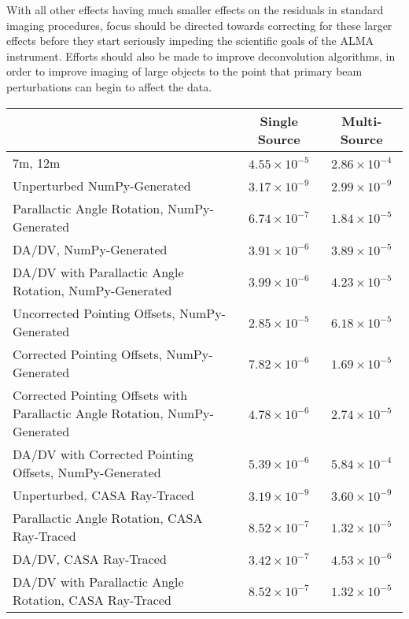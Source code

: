 \documentclass[11pt]{article}
\begin{document}
With all other effects having much smaller effects on the
residuals in standard imaging procedures, focus should be directed towards
correcting for these larger effects before they start seriously impeding the
scientific goals of the ALMA instrument. Efforts should also be made to improve 
deconvolution algorithms, in order to improve imaging of large objects to the 
point that primary beam perturbations can begin to affect the data.

\begin{table}
    \centering
    \begin{tabular}{|p{8cm}|c|c|}
    \hline
    & Single Source & Multi-Source  \\
    \hline
    7m, 12m & $4.55 \times 10^{-5}$ & $2.86 \times 10^{-4}$ \\
    \hline
    Unperturbed NumPy-Generated & $3.17 \times 10^{-9}$ & $2.99 \times
    10^{-9}$ \\
    \hline
    Parallactic Angle Rotation, NumPy-Generated & $6.74 \times 10^{-7}$ &
    $1.84 \times 10^{-5}$ \\
    \hline
    DA/DV, NumPy-Generated & $3.91 \times 10^{-6}$ & $3.89 \times 10^{-5}$ \\
    \hline
    DA/DV with Parallactic Angle Rotation, NumPy-Generated & $3.99 \times
    10^{-6}$ & $4.23 \times 10^{-5}$ \\
    \hline
    Uncorrected Pointing Offsets, NumPy-Generated & $2.85 \times 10^{-5}$ &
    $6.18 \times 10^{-5}$ \\
    \hline
    Corrected Pointing Offsets, NumPy-Generated & $7.82 \times 10^{-6}$ &
    $1.69 \times 10^{-5}$ \\
    \hline
    Corrected Pointing Offsets with Parallactic Angle Rotation,
    NumPy-Generated & $4.78 \times 10^{-6}$ & $2.74 \times 10^{-5}$ \\
    \hline
    DA/DV with Corrected Pointing Offsets, NumPy-Generated & $5.39 \times
    10^{-6}$ & $5.84 \times 10^{-4}$ \\
    \hline
    Unperturbed, CASA Ray-Traced& $3.19 \times 10^{-9}$ & $3.60 \times
    10^{-9}$ \\
    \hline
    Parallactic Angle Rotation, CASA Ray-Traced & $8.52 \times 10^{-7}$ &
    $1.32 \times 10^{-5}$ \\
    \hline
    DA/DV, CASA Ray-Traced & $3.42 \times 10^{-7}$ & $4.53 \times 10^{-6}$ \\
    \hline
    DA/DV with Parallactic Angle Rotation, CASA Ray-Traced & $8.52 \times
    10^{-7}$ & $1.32 \times 10^{-5}$ \\

\end{tabular}
\end{table}
\end{document}

